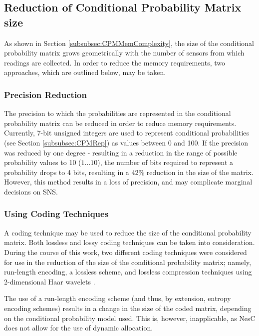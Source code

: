 \documentclass{sig-alternate-10pt}
\begin{document}
\subsection{Reduction of Conditional Probability Matrix size}

As shown in Section \ref{subsubsec:CPMMemComplexity}, the size of the conditional probability matrix grows geometrically with the number of sensors from which readings are collected. In order to reduce the memory requirements, two approaches, which are outlined below, may be taken.

\subsubsection{Precision Reduction}

The precision to which the probabilities are represented in the conditional probability matrix can be reduced in order to reduce memory requirements. Currently, 7-bit unsigned integers are used to represent conditional probabilities (see Section \ref{subsubsec:CPMRep}) as values between 0 and 100. If the precision was reduced by one degree - resulting in a reduction in the range of possible probability values to 10 ($1 \ldots 10$), the number of bits required to represent a probability drops to 4 bits, resulting in a 42\% reduction in the size of the matrix. However, this method results in a loss of precision, and may complicate marginal decisions on SNS.

\subsubsection{Using Coding Techniques}

A coding technique may be used to reduce the size of the conditional probability matrix. Both lossless and lossy coding techniques can be taken into consideration. During the course of this work, two different coding techniques were considered for use in the reduction of the size of the conditional probability matrix; namely, run-length encoding, a lossless scheme, and lossless compression techniques using 2-dimensional Haar wavelets \cite{WaveletsSpaniol:2007}.

The use of a run-length encoding scheme (and thus, by extension, entropy encoding schemes) results in a change in the size of the coded matrix, depending on the conditional probability model used. This is, however, inapplicable, as NesC does not allow for the use of dynamic allocation.
\end{document}
